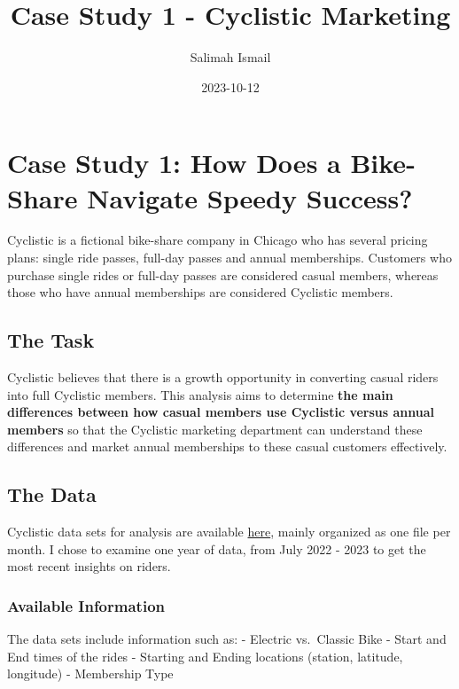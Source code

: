 \documentclass[
]{article}
\title{Case Study 1 - Cyclistic Marketing}
\author{Salimah Ismail}
\date{2023-10-12}
\begin{document}
\maketitle

\hypertarget{case-study-1-how-does-a-bike-share-navigate-speedy-success}{%
\section{Case Study 1: How Does a Bike-Share Navigate Speedy
Success?}\label{case-study-1-how-does-a-bike-share-navigate-speedy-success}}

Cyclistic is a fictional bike-share company in Chicago who has several
pricing plans: single ride passes, full-day passes and annual
memberships. Customers who purchase single rides or full-day passes are
considered casual members, whereas those who have annual memberships are
considered Cyclistic members.

\hypertarget{the-task}{%
\subsection{The Task}\label{the-task}}

Cyclistic believes that there is a growth opportunity in converting
casual riders into full Cyclistic members. This analysis aims to
determine \textbf{the main differences between how casual members use
Cyclistic versus annual members} so that the Cyclistic marketing
department can understand these differences and market annual
memberships to these casual customers effectively.

\hypertarget{the-data}{%
\subsection{The Data}\label{the-data}}

Cyclistic data sets for analysis are available
\href{https://divvy-tripdata.s3.amazonaws.com/index.html}{here}, mainly
organized as one file per month. I chose to examine one year of data,
from July 2022 - 2023 to get the most recent insights on riders.

\hypertarget{available-information}{%
\subsubsection{Available Information}\label{available-information}}

The data sets include information such as: - Electric vs.~Classic Bike -
Start and End times of the rides - Starting and Ending locations
(station, latitude, longitude) - Membership Type
\end{document}
